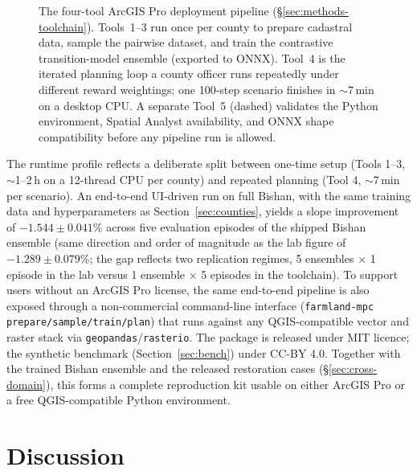 \documentclass[11pt]{article}
\begin{document}
\begin{figure}[htbp]
{%
}
\caption{The four-tool ArcGIS Pro deployment pipeline (\S\ref{sec:methods-toolchain}). Tools~1--3 run once per county to prepare cadastral data, sample the pairwise dataset, and train the contrastive transition-model ensemble (exported to ONNX). Tool~4 is the iterated planning loop a county officer runs repeatedly under different reward weightings; one 100-step scenario finishes in $\sim$7\,min on a desktop CPU. A separate Tool~5 (dashed) validates the Python environment, Spatial Analyst availability, and ONNX shape compatibility before any pipeline run is allowed.}
\label{fig:toolchain}
\end{figure}

The runtime profile reflects a deliberate split between one-time setup (Tools 1--3, $\sim$1--2\,h on a 12-thread CPU per county) and repeated planning (Tool 4, $\sim$7\,min per scenario). An end-to-end UI-driven run on full Bishan, with the same training data and hyperparameters as Section~\ref{sec:counties}, yields a slope improvement of $-1.544 \pm 0.041\%$ across five evaluation episodes of the shipped Bishan ensemble (same direction and order of magnitude as the lab figure of $-1.289 \pm 0.079\%$; the gap reflects two replication regimes, 5 ensembles × 1 episode in the lab versus 1 ensemble × 5 episodes in the toolchain). To support users without an ArcGIS Pro license, the same end-to-end pipeline is also exposed through a non-commercial command-line interface (\texttt{farmland-mpc prepare/sample/train/plan}) that runs against any QGIS-compatible vector and raster stack via \texttt{geopandas}/\texttt{rasterio}. The package is released under MIT licence; the synthetic benchmark (Section~\ref{sec:bench}) under CC-BY 4.0. Together with the trained Bishan ensemble and the released restoration cases (\S\ref{sec:cross-domain}), this forms a complete reproduction kit usable on either ArcGIS Pro or a free QGIS-compatible Python environment.

\section{Discussion}\label{sec:discussion}
\end{document}

